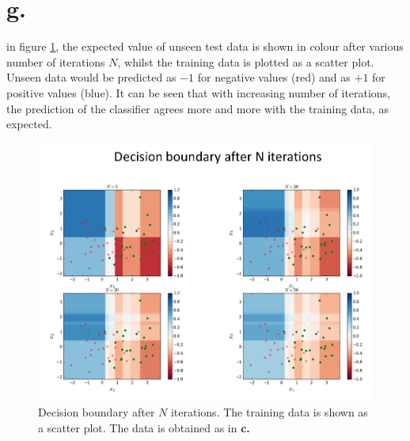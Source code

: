 \documentclass [a4paper] {report}
\begin{document}
	\section*{g.}
	in figure \ref{decision_boundary}, the expected value of unseen test data is shown in colour after various number of iterations $N$, whilst the training data is plotted as a scatter plot. Unseen data would be predicted as $-1$ for negative values (red) and as $+1$ for positive values (blue). It can be seen that with increasing number of iterations, the prediction of the classifier agrees more and more with the training data, as expected.
	
	\begin{figure}[H]
		\includegraphics[width = \textwidth]{Images/decision_boundary.png}
		\caption{Decision boundary after $N$ iterations. The training data is shown as a scatter plot. The data is obtained as in \textbf{c.}}
		\label{decision_boundary}
	\end{figure}
\end{document}
